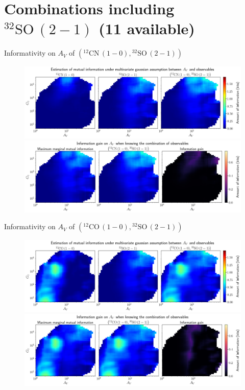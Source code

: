 \documentclass{beamer}
\begin{document}
\section{Combinations including $\mathrm{^{32}SO\,(2-1)}$ (11 available)}

\begin{frame}{Informativity on $A_V$ of $\left(\mathrm{^{12}CN\,(1-0)},\mathrm{^{32}SO\,(2-1)}\right)$}
    \begin{figure}
        \centering
        \includegraphics[width=0.95\linewidth]{../linearinfo/av__12cn10_32so21_linearinfo.png}
        \vfill
        \includegraphics[width=0.95\linewidth]{../linearinfo/av__12cn10_32so21_linearinfo_gain.png}
    \end{figure}
\end{frame}

\begin{frame}{Informativity on $A_V$ of $\left(\mathrm{^{12}CO\,(1-0)},\mathrm{^{32}SO\,(2-1)}\right)$}
    \begin{figure}
        \centering
        \includegraphics[width=0.95\linewidth]{../linearinfo/av__12co10_32so21_linearinfo.png}
        \vfill
        \includegraphics[width=0.95\linewidth]{../linearinfo/av__12co10_32so21_linearinfo_gain.png}
    \end{figure}
\end{frame}
\end{document}
